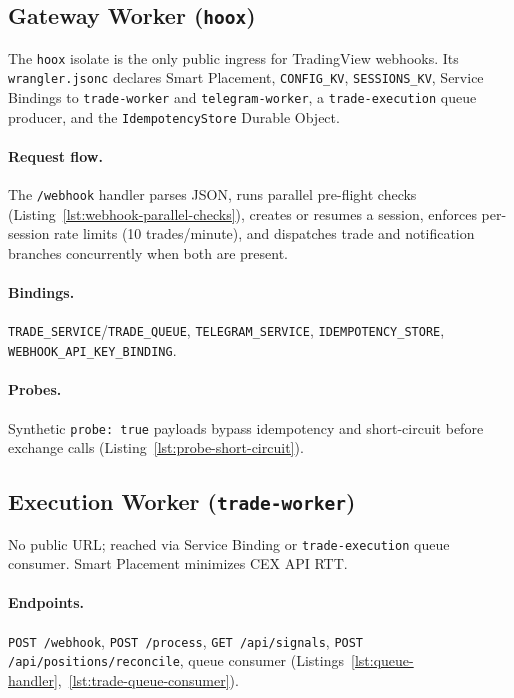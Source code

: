 \subsection{Gateway Worker (\texttt{hoox})}

The \texttt{hoox} isolate is the only public ingress for TradingView webhooks. Its \texttt{wrangler.jsonc} declares Smart Placement, \texttt{CONFIG\_KV}, \texttt{SESSIONS\_KV}, Service Bindings to \texttt{trade-worker} and \texttt{telegram-worker}, a \texttt{trade-execution} queue producer, and the \texttt{IdempotencyStore} Durable Object.

\paragraph{Request flow.} The \texttt{/webhook} handler parses JSON, runs parallel pre-flight checks (Listing~\ref{lst:webhook-parallel-checks}), creates or resumes a session, enforces per-session rate limits (10 trades/minute), and dispatches trade and notification branches concurrently when both are present.

\paragraph{Bindings.} \texttt{TRADE\_SERVICE}/\texttt{TRADE\_QUEUE}, \texttt{TELEGRAM\_SERVICE}, \texttt{IDEMPOTENCY\_STORE}, \texttt{WEBHOOK\_API\_KEY\_BINDING}.

\paragraph{Probes.} Synthetic \texttt{probe: true} payloads bypass idempotency and short-circuit before exchange calls (Listing~\ref{lst:probe-short-circuit}).

\subsection{Execution Worker (\texttt{trade-worker})}

No public URL; reached via Service Binding or \texttt{trade-execution} queue consumer. Smart Placement minimizes CEX API RTT.

\paragraph{Endpoints.} \texttt{POST /webhook}, \texttt{POST /process}, \texttt{GET /api/signals}, \texttt{POST /api/positions/reconcile}, queue consumer (Listings~\ref{lst:queue-handler},~\ref{lst:trade-queue-consumer}).

